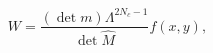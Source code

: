 \begin{equation}
  W = \frac{(\det   m)\Lambda^{2N_c-1}}{\det \hat{M}}
  f(x,y), \label{fxy}
\end{equation}

